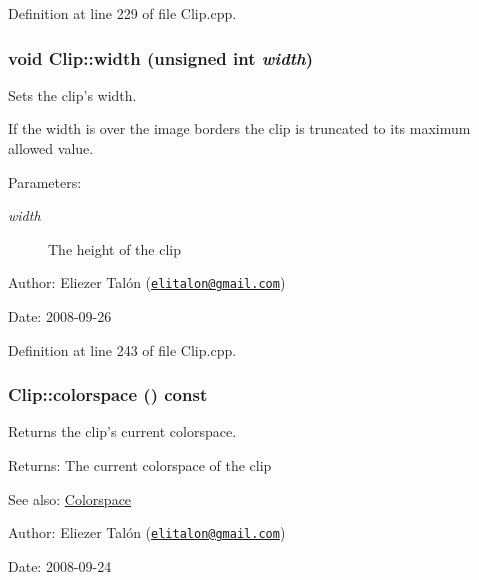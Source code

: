 Definition at line 229 of file Clip.cpp.\hypertarget{class_clip_17c1a23e159bedb6e2988235b8b568e7}{
\subsubsection[width]{\setlength{\rightskip}{0pt plus 5cm}void Clip::width (unsigned int {\em width})}}
\label{class_clip_17c1a23e159bedb6e2988235b8b568e7}


Sets the clip's width. 

If the width is over the image borders the clip is truncated to its maximum allowed value.

\begin{Desc}
\item[Parameters:]
\begin{description}
\item[{\em width}]The height of the clip\end{description}
\end{Desc}
\begin{Desc}
\item[Author:]Eliezer Talón (\href{mailto:elitalon@gmail.com}{\tt elitalon@gmail.com}) \end{Desc}
\begin{Desc}
\item[Date:]2008-09-26 \end{Desc}


Definition at line 243 of file Clip.cpp.\hypertarget{class_clip_e22de9122a399af67576eb114842846a}{
\subsubsection[colorspace]{ Clip::colorspace () const}}
\label{class_clip_e22de9122a399af67576eb114842846a}


Returns the clip's current colorspace. 

\begin{Desc}
\item[Returns:]The current colorspace of the clip\end{Desc}
\begin{Desc}
\item[See also:]\hyperlink{_colorspace_8h_7a7e24cdb2a27271343f0adceff89f65}{Colorspace}\end{Desc}
\begin{Desc}
\item[Author:]Eliezer Talón (\href{mailto:elitalon@gmail.com}{\tt elitalon@gmail.com}) \end{Desc}
\begin{Desc}
\item[Date:]2008-09-24 \end{Desc}



